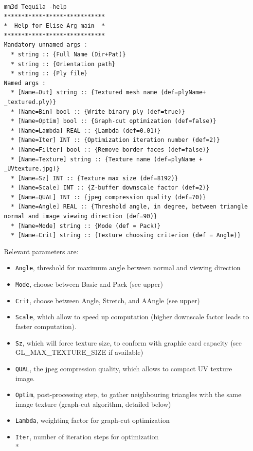 \begin{verbatim}
mm3d Tequila -help
*****************************
*  Help for Elise Arg main  *
*****************************
Mandatory unnamed args : 
  * string :: {Full Name (Dir+Pat)}
  * string :: {Orientation path}
  * string :: {Ply file}
Named args : 
  * [Name=Out] string :: {Textured mesh name (def=plyName+ _textured.ply)}
  * [Name=Bin] bool :: {Write binary ply (def=true)}
  * [Name=Optim] bool :: {Graph-cut optimization (def=false)}
  * [Name=Lambda] REAL :: {Lambda (def=0.01)}
  * [Name=Iter] INT :: {Optimization iteration number (def=2)}
  * [Name=Filter] bool :: {Remove border faces (def=false)}
  * [Name=Texture] string :: {Texture name (def=plyName + _UVtexture.jpg)}
  * [Name=Sz] INT :: {Texture max size (def=8192)}
  * [Name=Scale] INT :: {Z-buffer downscale factor (def=2)}
  * [Name=QUAL] INT :: {jpeg compression quality (def=70)}
  * [Name=Angle] REAL :: {Threshold angle, in degree, between triangle normal and image viewing direction (def=90)}
  * [Name=Mode] string :: {Mode (def = Pack)}
  * [Name=Crit] string :: {Texture choosing criterion (def = Angle)}

\end{verbatim}

Relevant parameters are:
\begin{itemize}
\item {\tt Angle}, threshold for maximum angle between normal and viewing direction
\item {\tt Mode}, choose between Basic and Pack (see upper)
\item {\tt Crit}, choose between Angle, Stretch, and AAngle (see upper)
\item {\tt Scale}, which allow to speed up computation (higher downscale factor leads to faster computation).
\item {\tt Sz}, which will force texture size, to conform with graphic card capacity (see GL\_MAX\_TEXTURE\_SIZE if available)
\item {\tt QUAL}, the jpeg compression quality, which allows to compact UV texture image.
\item {\tt Optim}, post-processing step, to gather neighbouring triangles with the same image texture (graph-cut algorithm, detailed below)
\item {\tt Lambda}, weighting factor for graph-cut optimization
\item {\tt Iter}, number of iteration steps for optimization\\*
\end{itemize}

